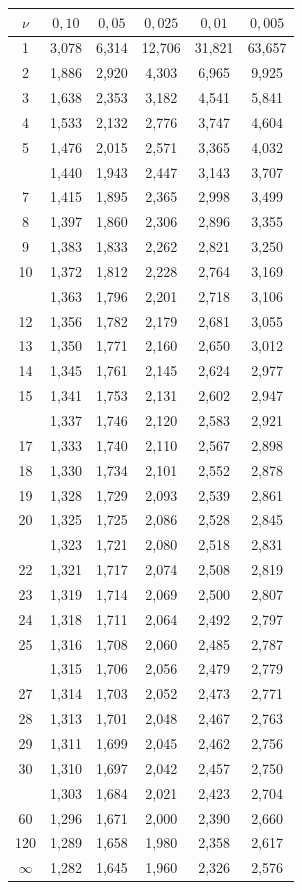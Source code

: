 \begin{tabular}{@{}c|*{5}{c}@{}}\toprule
$\nu$ & $0,10$ & $0,05$ & $0,025$ & $0,01$ & $0,005$\\\midrule
1 & 3,078 & 6,314 & 12,706 & 31,821 & 63,657\\
2 & 1,886 & 2,920 & 4,303 & 6,965 & 9,925\\
3 & 1,638 & 2,353 & 3,182 & 4,541 & 5,841\\
4 & 1,533 & 2,132 & 2,776 & 3,747 & 4,604\\
5 & 1,476 & 2,015 & 2,571 & 3,365 & 4,032\\
\addlinespace[2pt]
6 & 1,440 & 1,943 & 2,447 & 3,143 & 3,707\\
7 & 1,415 & 1,895 & 2,365 & 2,998 & 3,499\\
8 & 1,397 & 1,860 & 2,306 & 2,896 & 3,355\\
9 & 1,383 & 1,833 & 2,262 & 2,821 & 3,250\\
10 & 1,372 & 1,812 & 2,228 & 2,764 & 3,169\\
\addlinespace[2pt]
11 & 1,363 & 1,796 & 2,201 & 2,718 & 3,106\\
12 & 1,356 & 1,782 & 2,179 & 2,681 & 3,055\\
13 & 1,350 & 1,771 & 2,160 & 2,650 & 3,012\\
14 & 1,345 & 1,761 & 2,145 & 2,624 & 2,977\\
15 & 1,341 & 1,753 & 2,131 & 2,602 & 2,947\\
\addlinespace[2pt]
16 & 1,337 & 1,746 & 2,120 & 2,583 & 2,921\\
17 & 1,333 & 1,740 & 2,110 & 2,567 & 2,898\\
18 & 1,330 & 1,734 & 2,101 & 2,552 & 2,878\\
19 & 1,328 & 1,729 & 2,093 & 2,539 & 2,861\\
20 & 1,325 & 1,725 & 2,086 & 2,528 & 2,845\\
\addlinespace[2pt]
21 & 1,323 & 1,721 & 2,080 & 2,518 & 2,831\\
22 & 1,321 & 1,717 & 2,074 & 2,508 & 2,819\\
23 & 1,319 & 1,714 & 2,069 & 2,500 & 2,807\\
24 & 1,318 & 1,711 & 2,064 & 2,492 & 2,797\\
25 & 1,316 & 1,708 & 2,060 & 2,485 & 2,787\\
\addlinespace[2pt]
26 & 1,315 & 1,706 & 2,056 & 2,479 & 2,779\\
27 & 1,314 & 1,703 & 2,052 & 2,473 & 2,771\\
28 & 1,313 & 1,701 & 2,048 & 2,467 & 2,763\\
29 & 1,311 & 1,699 & 2,045 & 2,462 & 2,756\\
30 & 1,310 & 1,697 & 2,042 & 2,457 & 2,750\\
\addlinespace[2pt]
40 & 1,303 & 1,684 & 2,021 & 2,423 & 2,704\\
60 & 1,296 & 1,671 & 2,000 & 2,390 & 2,660\\
120 & 1,289 & 1,658 & 1,980 & 2,358 & 2,617\\
$\infty$ & 1,282 & 1,645 & 1,960 & 2,326 & 2,576\\
\bottomrule\end{tabular}
